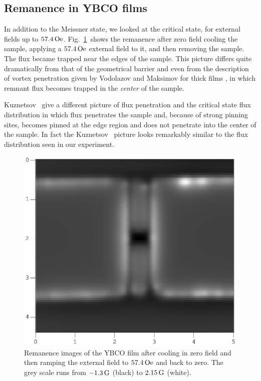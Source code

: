 \index{\hcone|)}

\subsection{Remanence in YBCO films}
%
%
In addition to the Meissner state, we looked at the 
critical state, for external fields up to $57.4\,\Oe$. 
Fig.~\ref{fig:remanence_b}\ shows the remanence after zero
field cooling the sample, applying a $57.4\,\Oe$ external
field to it, and then removing the sample. The flux became
trapped near the edges of the sample. This picture differs
quite dramatically from that of the geometrical barrier
\cite{zeldov_prl_73_1428_1994} 
and even from the description of vortex penetration given
by Vodolazov and Maksimov for thick films
\cite{vodolazov_physc_349_125_2001},
in which remnant flux becomes
trapped in the \emph{center} of the sample. 

Kuznetsov \etal\,\cite{kuznetsov_prb_59_1507_1999} give a
different picture of flux penetration and the critical
state flux distribution in which flux penetrates the sample 
and, because of strong pinning sites, becomes
pinned at the edge region and does not penetrate into the 
center of the sample. In fact the Kuznetsov \etal\ picture
looks remarkably similar to the flux distribution seen 
in our experiment.

%
%
\begin{figure}[p]
\includegraphics[width=5.7in]{figs/magpen/fig11b.eps}
\caption[Remanence image of YBCO/STO film after peak field of
$57.4\,\Oe$.]
{Remanence images of the YBCO film after cooling in zero
field and then ramping the external field to 
$57.4\,\Oe$ and back to zero. The grey scale runs from $-1.3\,\mathrm{G}$ (black)
to $2.15\,\mathrm{G}$ (white). 
 }
\label{fig:remanence_b}
\end{figure}

